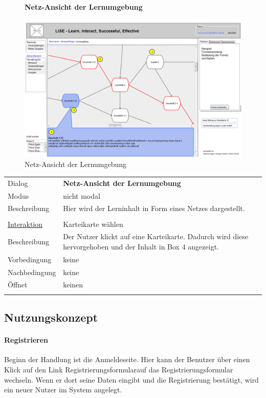 \documentclass[12pt,a4paper]{article}
\begin{document}
{\begin{figure}[H]
	\paragraph{Netz-Ansicht der Lernumgebung}
	\includegraphics[width=\textwidth]{Bilder/Mockups/GUI/NetzAnsichtKarteikarten.png}
	\caption{Netz-Ansicht der Lernumgebung}
	\label{GuiNetzAnsichtKarteikarten}
\end{figure}
\begin{tabular}{l p{12cm}}
	Dialog 	 & \textbf{Netz-Ansicht der Lernumgebung} \\ 
	Modus & nicht modal\\ 
	Beschreibung   	& Hier wird der Lerninhalt in Form eines Netzes dargestellt. \\\\
	
	\underline{Interaktion} 	 & Karteikarte wählen\\ 
	Beschreibung   	& Der Nutzer klickt auf eine Karteikarte. Dadurch wird diese hervorgehoben und der Inhalt in Box 4 angezeigt.\\
	Vorbedingung	& keine \\
	Nachbedingung	& keine \\
	Öffnet			& keinen\\\\
\end{tabular}


\subsection{Nutzungskonzept}
\paragraph{Registrieren}
Beginn der Handlung ist die Anmeldeseite. Hier kann der Benutzer über einen Klick auf den Link \glqq Registrierungsformular\grqq auf das Registrierungsformular wechseln. Wenn er dort seine Daten eingibt und die Registrierung bestätigt, wird ein neuer Nutzer im System angelegt.

}
\end{document}
